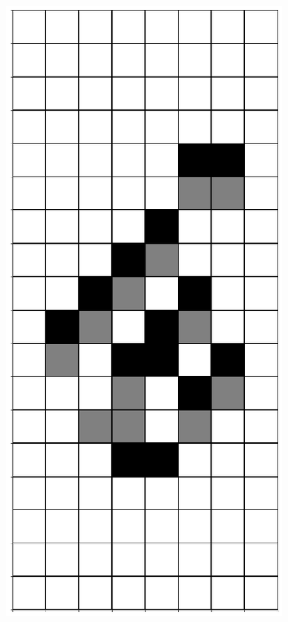 \documentclass[12pt]{article}
\numberwithin{figure}{section} %
\begin{document}
\begin{figure}[H]
\begin{subfigure}{0.19\textwidth}
     \subcaption{}
   \end{subfigure}
     \begin{subfigure}{0.19\textwidth}
     \centering
     \includegraphics[width=\linewidth]{Section4/27.1}

\end{subfigure}
\end{figure}
\end{document}

